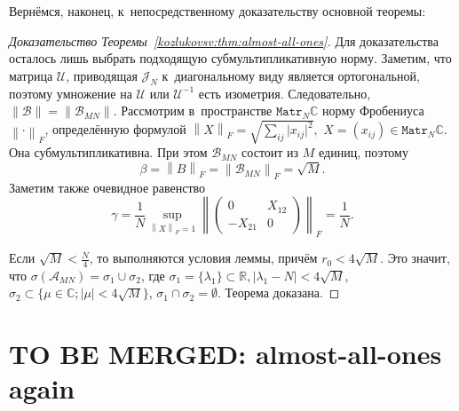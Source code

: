 \documentclass[a4paper]{article}
\theoremstyle{definition}
\begin{document}
Верн\"емся, наконец, к~непосредственному доказательству основной теоремы:
\begin{proof}[Доказательство Теоремы~\ref{kozlukovsv:thm:almost-all-ones}]
    Для доказательства осталось лишь выбрать подходящую субмультипликативную норму.
    Заметим, что матрица \( \mathcal{U} \),
    приводящая \( \mathcal{J}_N \) к~диагональному виду
    является ортогональной,
    поэтому умножение на \( \mathcal{U} \) или \(\mathcal{U}^{-1}\)
    есть изометрия.
    Следовательно, \( \|\mathcal{B}\|=\|\mathscr{B}_{MN}\| \).
    Рассмотрим в~пространстве \( \mathtt{Matr}_{N}\mathbb{C} \)
    норму Фробениуса \( {\left\|\cdot\right\|}_{F} \),
    определ\"енную формулой
    \( {\left\|X\right\|}_{F} = \sqrt{\sum_{ij} \lvert x_{ij}\rvert^2}, \)
    \( X = (x_{ij})\in\mathtt{Matr}_N\mathbb{C} \).
    Она субмультипликативна.
    При этом
    \( \mathscr{B}_{MN} \) состоит из \( M \) единиц, поэтому
    \[
        \beta = {\left\|B\right\|}_{F} =
        {\left\|\mathscr{B}_{MN}\right\|}_{F} = \sqrt{M}.
        \]
    Заметим также очевидное равенство
    \[
        \gamma = \frac1N
                \sup_{{\left\|X\right\|}_{F}=1}{\left\|\begin{pmatrix}0 & X_{12} \\ -X_{21} & 0\end{pmatrix}\right\|}_{F}
                = \frac1N. \]
    
    Если
     \( \sqrt{M} < \frac{N}{4} \),
     то выполняются условия леммы,
     прич\"ем \( r_0 < 4\sqrt{M} \).
    Это значит, что
     \( \sigma(\mathscr{A}_{MN}) = \sigma_1 \cup \sigma_2 \),
     где \( \sigma_1 = \{ \lambda_1 \}\subset\mathbb{R}, \lvert \lambda_1 - N \rvert < 4\sqrt{M} \),
     \( \sigma_2 \subset \{ \mu\in\mathbb{C}; \lvert\mu\rvert < 4\sqrt{M} \} \),
     \( \sigma_1 \cap \sigma_2 = \emptyset \).
    Теорема доказана.
    \end{proof}

    \newpage

\section{TO BE MERGED: almost-all-ones again}
\end{document}
